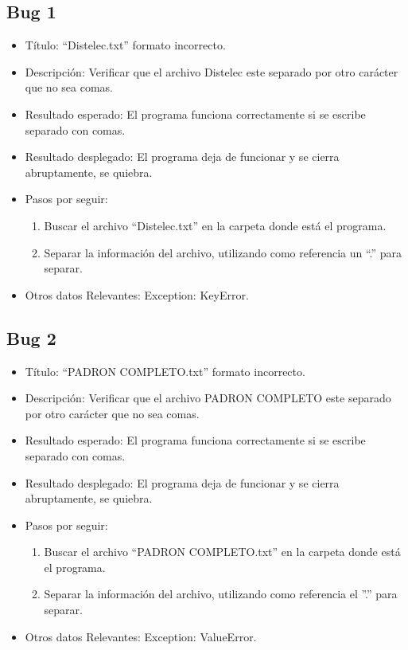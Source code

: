\documentclass[conference]{IEEEtran}
\begin{document}
\subsection*{Bug 1}
\begin{itemize}

\item Título: “Distelec.txt” formato incorrecto.

\item Descripción: Verificar que el archivo Distelec este separado por otro carácter que no sea comas.

\item Resultado esperado: El programa funciona correctamente si se escribe separado con comas.

\item Resultado desplegado: El programa deja de funcionar y se cierra abruptamente, se quiebra. 

\item Pasos por seguir: 
\begin{enumerate}
\item Buscar el archivo “Distelec.txt” en la carpeta donde está el programa.
\item Separar la información del archivo, utilizando como referencia un “.” para separar.
\end{enumerate}

\item Otros datos Relevantes: Exception: KeyError.
\end{itemize}
\subsection*{Bug 2}
\begin{itemize}
\item Título: “PADRON COMPLETO.txt” formato incorrecto.

\item Descripción: Verificar que el archivo PADRON COMPLETO este separado por otro carácter que no sea comas.

\item Resultado esperado: El programa funciona correctamente si se escribe separado con comas.

\item Resultado desplegado: El programa deja de funcionar y se cierra abruptamente, se quiebra.  

\item Pasos por seguir: 
\begin{enumerate}
\item Buscar el archivo “PADRON COMPLETO.txt” en la carpeta donde está el programa.  
\item Separar la información del archivo, utilizando como referencia el ”.” para separar.
\end{enumerate}
\item Otros datos Relevantes: Exception: ValueError.
\end{itemize}
\end{document}
